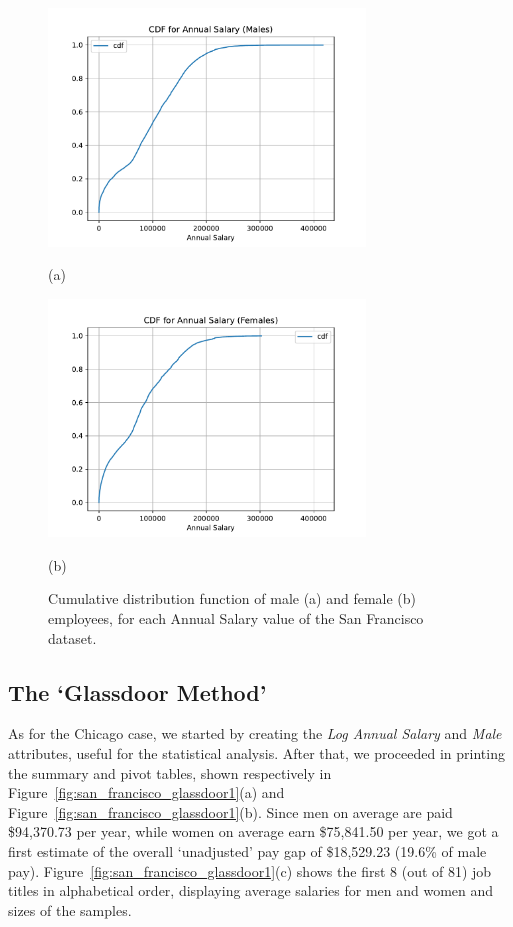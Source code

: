\begin{figure}[t!]
\centering
\includegraphics[width=0.75\textwidth]{figures/san_francisco_cdf_annual_salary_males.pdf}
\caption*{(a)}
\includegraphics[width=0.75\textwidth]{figures/san_francisco_cdf_annual_salary_females.pdf}
\caption*{(b)}
\caption{Cumulative distribution function of male (a) and female (b) employees, for each \textrm{Annual Salary} value of the San Francisco dataset.}
\label{fig:san_francisco_preprocessing2}
\end{figure}


\subsection{The `Glassdoor Method'}
As for the Chicago case, we started by creating the \textit{Log Annual Salary} and \textit{Male} attributes, useful for the statistical analysis. After that, we proceeded in printing the summary and pivot tables, shown respectively in Figure~\ref{fig:san_francisco_glassdoor1}(a) and Figure~\ref{fig:san_francisco_glassdoor1}(b). Since men on average are paid \$94,370.73 per year, while women on average earn \$75,841.50 per year, we got a first estimate of the overall `unadjusted' pay gap of \$18,529.23 (19.6\% of male pay). Figure~\ref{fig:san_francisco_glassdoor1}(c) shows the first 8 (out of 81) job titles in alphabetical order, displaying average salaries for men and women and sizes of the samples.

